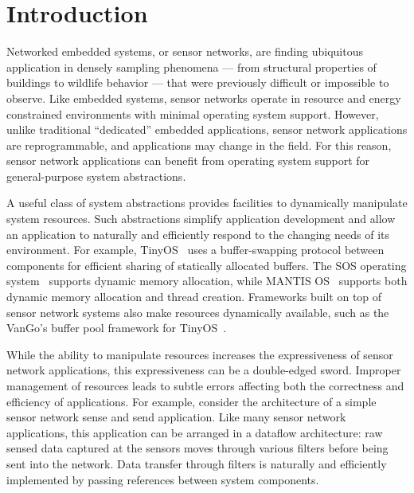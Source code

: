 \section{Introduction}
\label{sec:intro}

% 
% 
% 
% 


Networked embedded systems, or sensor networks, are finding ubiquitous
application in densely sampling phenomena --- from structural properties of
buildings to wildlife behavior --- that were previously difficult or
impossible to observe.  
%
Like embedded systems, sensor networks operate in resource and energy
constrained environments with minimal operating system support.  
%
However, unlike traditional ``dedicated'' embedded applications, sensor
network applications are reprogrammable, and applications may change in the
field.  
%
For this reason, sensor network applications can benefit from operating
system support for general-purpose system abstractions.



A useful class of system abstractions provides facilities to dynamically
manipulate system resources.  
%
Such abstractions simplify application development and allow an application
to naturally and efficiently respond to the changing needs of its
environment.  
%
For example, TinyOS~\cite{TinyOS} uses a buffer-swapping protocol between
components for efficient sharing of statically allocated buffers.  
%
The SOS operating system~\cite{sos} supports dynamic memory allocation,
while MANTIS OS~\cite{abrach03mantis} supports both dynamic memory
allocation and thread creation.  
%
Frameworks built on top of sensor network systems also make resources
dynamically available, such as the VanGo's buffer pool framework for
TinyOS~\cite{greenstein05vango}.



While the ability to manipulate resources increases the expressiveness of
sensor network applications, this expressiveness can be a double-edged
sword.  
%
Improper management of resources leads to subtle errors affecting both the
correctness and efficiency of applications.
%
For example, consider the architecture of a simple sensor network sense and
send application.  
%
Like many sensor network applications, this application can be arranged in
a dataflow architecture:  raw sensed data captured at the sensors moves
through various filters before being sent into the network.  
%
Data transfer through filters is naturally and efficiently implemented by
passing references between system components.



